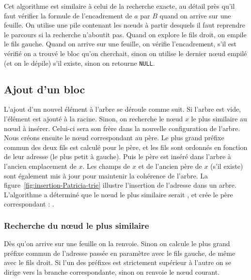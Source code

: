 Cet algorithme est similaire à celui de la recherche exacte, au détail près
qu'il faut vérifier la formule de l'encadrement de $a$ par $B$ quand on arrive
sur une feuille.
On utilise une pile contenant les n\oe{}uds à partir desquels il faut reprendre
le parcours si la recherche n'aboutit pas.
Quand on explore le fils droit, on empile le fils gauche.
Quand on arrive sur une feuille, on vérifie l'encadrement, s'il est vérifié on
a trouvé le bloc qu'on cherchait, sinon on utilise le dernier n\oe{}ud empilé
(et on le dépile) s'il existe, sinon on retourne \lstinline{NULL}.


\subsection{Ajout d'un bloc}





L'ajout d'un nouvel élément à l'arbre se déroule comme suit. Si l'arbre est
vide, l'élément est ajouté à la racine.
Sinon, on recherche le n\oe{}ud $x$ le plus similaire au n\oe{}ud à insérer.
Celui-ci sera son frère dans la nouvelle configuration de l'arbre.
Nous créons ensuite le n\oe{}ud correspondant au père.
Le plus grand préfixe commun des deux fils est calculé pour le père, et les fils
sont ordonnés en fonction de leur adresse (le plus petit à gauche).
Puis le père est inséré dans l'arbre à l'ancien emplacement de $x$.
Les champs de $x$ et de l'ancien père de $x$ (s'il existe) sont également mis à
jour pour maintenir la cohérence de l'arbre.
La figure~\ref{fig:insertion-Patricia-trie} illustre l'insertion de l'adresse
 dans un arbre.
L'algorithme a déterminé que le n\oe{}ud le plus similaire serait
, et crée le père correspondant :
.


\subsubsection*{Recherche du n\oe{}ud le plus similaire}


Dès qu'on arrive sur une feuille on la renvoie.
Sinon on calcule le plus grand préfixe commun de l'adresse passée en paramètre
avec le fils gauche, de même avec le fils droit.
Si l'un des préfixes est strictement supérieur à l'autre on se dirige vers la
branche correspondante, sinon on renvoie le n\oe{}ud courant.


